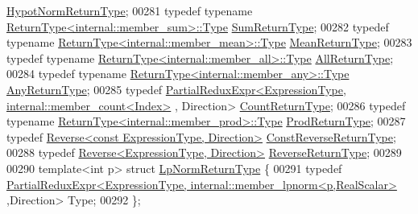 \begin{DoxyCode}
       \hyperlink{group___core___module_class_eigen_1_1_partial_redux_expr}{HypotNormReturnType};
00281     \textcolor{keyword}{typedef} \textcolor{keyword}{typename} \hyperlink{group___core___module_class_eigen_1_1_partial_redux_expr}{ReturnType<internal::member\_sum>::Type} 
      \hyperlink{group___core___module_class_eigen_1_1_partial_redux_expr}{SumReturnType};
00282     \textcolor{keyword}{typedef} \textcolor{keyword}{typename} \hyperlink{group___core___module_class_eigen_1_1_partial_redux_expr}{ReturnType<internal::member\_mean>::Type} 
      \hyperlink{group___core___module_class_eigen_1_1_partial_redux_expr}{MeanReturnType};
00283     \textcolor{keyword}{typedef} \textcolor{keyword}{typename} \hyperlink{group___core___module_class_eigen_1_1_partial_redux_expr}{ReturnType<internal::member\_all>::Type} 
      \hyperlink{group___core___module_class_eigen_1_1_partial_redux_expr}{AllReturnType};
00284     \textcolor{keyword}{typedef} \textcolor{keyword}{typename} \hyperlink{group___core___module_class_eigen_1_1_partial_redux_expr}{ReturnType<internal::member\_any>::Type} 
      \hyperlink{group___core___module_class_eigen_1_1_partial_redux_expr}{AnyReturnType};
00285     \textcolor{keyword}{typedef} \hyperlink{group___core___module_class_eigen_1_1_partial_redux_expr}{PartialReduxExpr<ExpressionType, internal::member\_count<Index>}
      , Direction> \hyperlink{group___core___module_class_eigen_1_1_partial_redux_expr}{CountReturnType};
00286     \textcolor{keyword}{typedef} \textcolor{keyword}{typename} \hyperlink{group___core___module_class_eigen_1_1_partial_redux_expr}{ReturnType<internal::member\_prod>::Type} 
      \hyperlink{group___core___module_class_eigen_1_1_partial_redux_expr}{ProdReturnType};
00287     \textcolor{keyword}{typedef} \hyperlink{group___core___module_class_eigen_1_1_reverse}{Reverse<const ExpressionType, Direction>} 
      \hyperlink{group___core___module_class_eigen_1_1_reverse}{ConstReverseReturnType};
00288     \textcolor{keyword}{typedef} \hyperlink{group___core___module_class_eigen_1_1_reverse}{Reverse<ExpressionType, Direction>} 
      \hyperlink{group___core___module_class_eigen_1_1_reverse}{ReverseReturnType};
00289 
00290     \textcolor{keyword}{template}<\textcolor{keywordtype}{int} p> \textcolor{keyword}{struct }\hyperlink{struct_eigen_1_1_vectorwise_op_1_1_lp_norm_return_type}{LpNormReturnType} \{
00291       \textcolor{keyword}{typedef} 
      \hyperlink{group___core___module_class_eigen_1_1_partial_redux_expr}{PartialReduxExpr<ExpressionType, internal::member\_lpnorm<p,RealScalar>}
      ,Direction> Type;
00292     \};

\end{DoxyCode}
